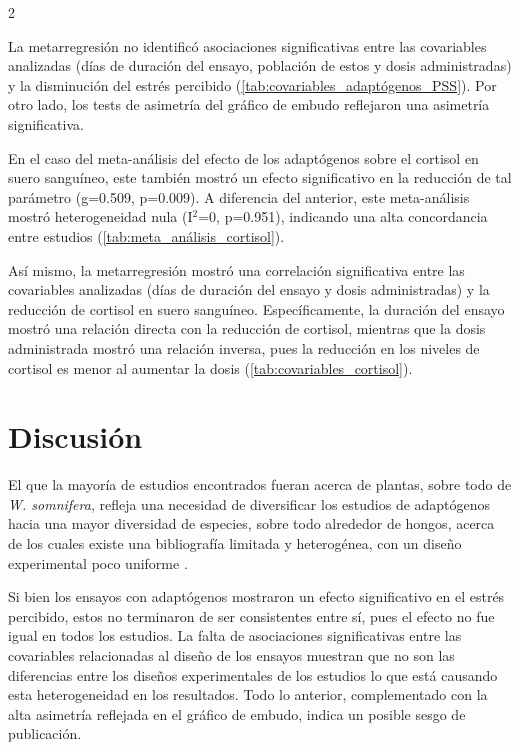 \begin{multicols}{2}

La metarregresión no identificó asociaciones significativas entre las covariables analizadas (días de duración del ensayo, población de estos y dosis administradas) y la disminución del estrés percibido (\autoref{tab:covariables_adaptógenos_PSS}). Por otro lado, los tests de asimetría del gráfico de embudo reflejaron una asimetría significativa.

En el caso del meta-análisis del efecto de los adaptógenos sobre el cortisol en suero sanguíneo, este también mostró un efecto significativo en la reducción de tal parámetro (g=0.509, p=0.009). A diferencia del anterior, este meta-análisis mostró heterogeneidad nula (I$^{2}$=0, p=0.951), indicando una alta concordancia entre estudios (\autoref{tab:meta_análisis_cortisol}).

Así mismo, la metarregresión mostró una correlación significativa entre las covariables analizadas (días de duración del ensayo y dosis administradas) y la reducción de cortisol en suero sanguíneo. Específicamente, la duración del ensayo mostró una relación directa con la reducción de cortisol, mientras que la dosis administrada mostró una relación inversa, pues la reducción en los niveles de cortisol es menor al aumentar la dosis (\autoref{tab:covariables_cortisol}).

    
    

    
    

\section{Discusión}

El que la mayoría de estudios encontrados fueran acerca de plantas, sobre todo de \textit{W. somnifera}, refleja una necesidad de diversificar los estudios de adaptógenos hacia una mayor diversidad de especies, sobre todo alrededor de hongos, acerca de los cuales existe una bibliografía limitada y heterogénea, con un diseño experimental poco uniforme \citep{panossian2018}.

Si bien los ensayos con adaptógenos mostraron un efecto significativo en el estrés percibido, estos no terminaron de ser consistentes entre sí, pues el efecto no fue igual en todos los estudios. La falta de asociaciones significativas entre las covariables relacionadas al diseño de los ensayos muestran que no son las diferencias entre los diseños experimentales de los estudios lo que está causando esta heterogeneidad en los resultados. Todo lo anterior, complementado con la alta asimetría reflejada en el gráfico de embudo, indica un posible sesgo de publicación.


\end{multicols}

